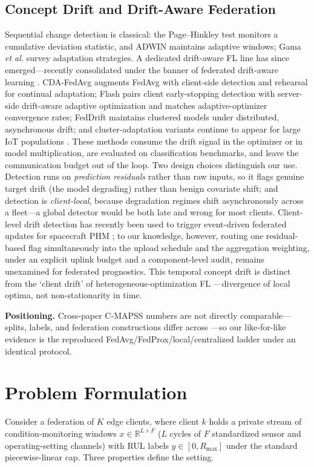 \documentclass[journal]{IEEEtran}
\begin{document}
\subsection{Concept Drift and Drift-Aware Federation}
Sequential change detection is classical: the Page--Hinkley test \cite{page1954} monitors a cumulative deviation statistic, and ADWIN \cite{bifet2007} maintains adaptive windows; Gama \emph{et al.} \cite{gama2014} survey adaptation strategies. A dedicated drift-aware FL line has since emerged---recently consolidated under the banner of federated drift-aware learning \cite{fdal2025survey}. CDA-FedAvg \cite{casado2022} augments FedAvg with client-side detection and rehearsal for continual adaptation; Flash \cite{panchal2023flash} pairs client early-stopping detection with server-side drift-aware adaptive optimization and matches adaptive-optimizer convergence rates; FedDrift \cite{jothimurugesan2023} maintains clustered models under distributed, asynchronous drift; and cluster-adaptation variants continue to appear for large IoT populations \cite{fedplc2026}. These methods consume the drift signal in the optimizer or in model multiplication, are evaluated on classification benchmarks, and leave the communication budget out of the loop. Two design choices distinguish our use. Detection runs on \emph{prediction residuals} rather than raw inputs, so it flags genuine target drift (the model degrading) rather than benign covariate shift; and detection is \emph{client-local}, because degradation regimes shift asynchronously across a fleet---a global detector would be both late and wrong for most clients. Client-level drift detection has recently been used to trigger event-driven federated updates for spacecraft PHM \cite{upc2026thesis}; to our knowledge, however, routing one residual-based flag simultaneously into the upload schedule and the aggregation weighting, under an explicit uplink budget and a component-level audit, remains unexamined for federated prognostics. This temporal concept drift is distinct from the `client drift' of heterogeneous-optimization FL \cite{li2020fedprox}---divergence of local optima, not non-stationarity in time.

\textbf{Positioning.} Cross-paper C-MAPSS numbers are not directly comparable---splits, labels, and federation constructions differ across \cite{zheng2017,asif2022,chen2023ghdr,vermelin2024}---so our like-for-like evidence is the reproduced FedAvg/FedProx/local/centralized ladder under an identical protocol.

\section{Problem Formulation}\label{sec:problem}
Consider a federation of $K$ edge clients, where client $k$ holds a private stream of condition-monitoring windows $x \in \mathbb{R}^{L \times F}$ ($L$ cycles of $F$ standardized sensor and operating-setting channels) with RUL labels $y \in [0, R_{\max}]$ under the standard piecewise-linear cap. Three properties define the setting.
\end{document}
